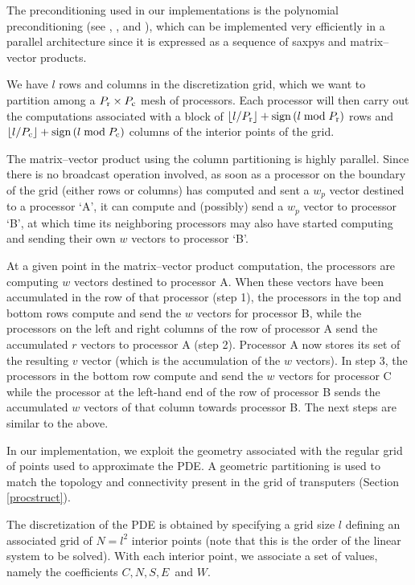 \documentclass{ecai}
\begin{document}
The preconditioning used in our implementations is the polynomial
preconditioning (see \cite{kn:Saad85}, \cite{kn:Eisenstat81},
\cite{kn:Adams85} and \cite{kn:Johnson83}), which can be implemented
very efficiently in a parallel architecture since it is expressed as a
sequence of saxpys and matrix--vector products.

We have $l$ rows and columns in the discretization grid, which we want
to partition among a $P_{\rm{r}}\times P_{\rm{c}}$ mesh of
processors. Each processor will then carry out the computations
associated with a block of $\lfloor
l/P_{\rm{r}}\rfloor+\hbox{sign}\left( l\bmod P_{\rm{r}}\right)$ rows
and $\lfloor l/P_{\rm{c}}\rfloor+\hbox{sign}\left( l\bmod
  P_{\rm{c}}\right)$ columns of the interior points of the grid.

The matrix--vector product using the column partitioning is highly
parallel. Since there is no broadcast operation involved, as soon as a
processor on the boundary of the grid (either rows or columns) has
computed and sent a $w_{p}$ vector destined to a processor `A', it can
compute and (possibly) send a $w_{p}$ vector to processor `B', at
which time its neighboring processors may also have started computing
and sending their own $w$ vectors to processor `B'.

At a given point in the matrix--vector product computation, the
processors are computing $w$ vectors destined to processor A. When
these vectors have been accumulated in the row of that processor (step
1), the processors in the top and bottom rows compute and send the $w$
vectors for processor B, while the processors on the left and right
columns of the row of processor A send the accumulated $r$ vectors to
processor A (step 2). Processor A now stores its set of the resulting
$v$ vector (which is the accumulation of the $w$ vectors). In step 3,
the processors in the bottom row compute and send the $w$ vectors for
processor C while the processor at the left-hand end of the row of
processor B sends the accumulated $w$ vectors of that column towards
processor B. The next steps are similar to the above.

In our implementation, we exploit the geometry associated with the
regular grid of points used to approximate the PDE. A geometric
partitioning is used to match the topology and connectivity present in
the grid of transputers (Section \ref{procstruct}).

The discretization of the PDE is obtained by specifying a grid size
$l$ defining an associated grid of $N=l^2$ interior points (note that
this is the order of the linear system to be solved). With each
interior point, we associate a set of values, namely the coefficients
$C, N, S, E\,$ and $W$.
\end{document}
